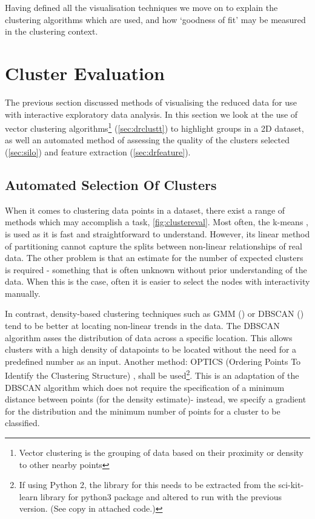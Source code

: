 Having defined all the visualisation techniques we move on to explain the clustering algorithms which are used, and how `goodness of fit' may be measured in the clustering context.


\section{Cluster Evaluation}
The previous section discussed methods of visualising the reduced data for use with interactive exploratory data analysis. In this section we look at the use of vector clustering algorithms\footnote{Vector clustering is the grouping of data based on their proximity or density to other nearby points} (\autoref{sec:drclustt}) to highlight groups in a 2D dataset, as well an automated method of assessing the quality of the clusters selected (\autoref{sec:silo}) and feature extraction (\autoref{sec:drfeature}).



\subsection{Automated Selection Of Clusters}\label{sec:drclustt}
    When it comes to clustering data points in a dataset, there exist a range of methods which may accomplish a task, \autoref{fig:clustereval}. Most often, the k-means \citep{kmeans}, is used as it is fast and straightforward to understand. However, its linear method of partitioning cannot capture the splits between non-linear relationships of real data. The other problem is that an estimate for the number of expected clusters is required - something that is often unknown without prior understanding of the data. When this is the case, often it is easier to select the nodes with interactivity manually.

In contrast, density-based clustering techniques such as GMM (\citep{scikit}) or DBSCAN (\citep{DBSCAN}) tend to be better at locating non-linear trends in the data. The DBSCAN algorithm asses the distribution of data across a specific location. This allows clusters with a high density of datapoints to be located without the need for a predefined number as an input. Another method: OPTICS (Ordering Points To Identify the Clustering Structure) \citep{optics}, shall be used\footnote{ If using Python 2, the library for this needs to be extracted from the sci-kit-learn library for python3 package and altered to run with the previous version. (See copy in attached code.)}. This is an adaptation of the DBSCAN algorithm which does not require the specification of a minimum distance between points (for the density estimate)- instead, we specify a gradient for the distribution and the minimum number of points for a cluster to be classified.


